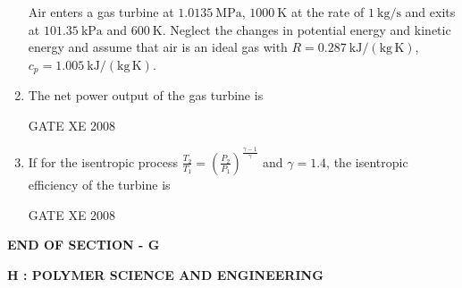 \documentclass[12pt]{article}
\begin{document}
\begin{enumerate}[label=Q\arabic*.]
Air enters a gas turbine at $1.0135~\mathrm{MPa}$, $1000~\mathrm{K}$ at the rate of $1~\mathrm{kg/s}$ and exits at $101.35~\mathrm{kPa}$ and $600~\mathrm{K}$.  
Neglect the changes in potential energy and kinetic energy and assume that air is an ideal gas with $R = 0.287~\mathrm{kJ/(kg\,K)}$, $c_p = 1.005~\mathrm{kJ/(kg\,K)}$.  

\item The net power output of the gas turbine is 

\begin{enumerate}[label=(\Alph*)]
\end{enumerate}

GATE XE 2008  

\item If for the isentropic process  
$
\frac{T_2}{T_1} = \left( \frac{P_2}{P_1} \right)^{\frac{\gamma-1}{\gamma}}
$ 
and $\gamma = 1.4$, the isentropic efficiency of the turbine is  

\begin{enumerate}[label=(\Alph*)]
\end{enumerate}

GATE XE 2008  

\end{enumerate}

\begin{center}
    \textbf{END OF SECTION - G}
\end{center}

\newpage

\begin{center}
    \textbf{\Large H : POLYMER SCIENCE AND ENGINEERING}
\end{center}
\end{document}
